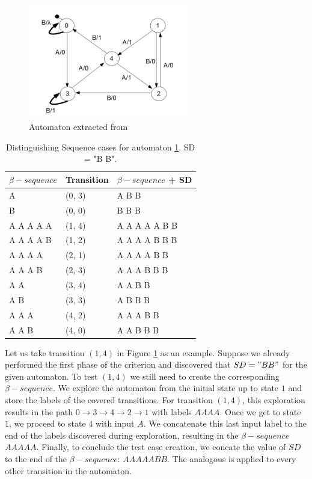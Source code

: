 \begin{itemize}
\begin{figure}[htb]
\centering
\includegraphics[width=7cm]{figuras/automatonDS_UIO}
\caption{\label{fig:automatonDS_UIO} Automaton extracted from \cite{inpe10}}
\end{figure}

\begin{table}
\begin{center}
\begin{tabular}{| l | l| l|}

\hline

$\beta-sequence$ & Transition & $\beta-sequence$ + SD \\ \hline

A & (0, 3) & A B B\\ \hline
B & (0, 0) & B B B\\ \hline
A A A A A & (1, 4) & A A A A A B B\\ \hline
A A A A B & (1, 2) & A A A A B B B\\ \hline
A A A A & (2, 1) & A A A A B B\\ \hline
A A A B & (2, 3) & A A A B B B\\ \hline
A A & (3, 4) & A A B B\\ \hline
A B & (3, 3) & A B B B\\ \hline
A A A & (4, 2) & A A A B B\\ \hline
A A B & (4, 0) & A A B B B\\
\hline
\end{tabular}
\end{center}
\caption{Distinguishing Sequence cases for automaton \ref{fig:automatonDS_UIO}. SD = "B B".\cite{inpe10}}
\label{tableDS}
\end{table}

Let us take transition $(1,4)$ in Figure \ref{fig:automatonDS_UIO} as an example. Suppose we already performed the first phase of the criterion and discovered that $SD = "B B"$ for the given automaton. To test $(1,4)$ we still need to create the corresponding $\beta-sequence$. We explore the automaton from the initial state up to state $1$ and store the labels of the covered transitions. For transition $(1,4)$, this exploration results in the path $0 \rightarrow 3 \rightarrow 4 \rightarrow 2 \rightarrow 1$ with labels $A A A A$. Once we get to state $1$, we proceed to state $4$ with input $A$. We concatenate this last input label to the end of the labels discovered during exploration, resulting in the $\beta-sequence$ $A A A A A$. Finally, to conclude the test case creation, we concate the value of $SD$ to the end of the $\beta-sequence$: $AAAAABB$. The analogous is applied to every other transition in the automaton.


\end{itemize}
